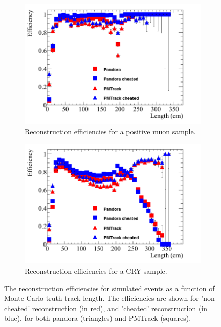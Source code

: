\begin{figure}[h!]
  \centering
  \begin{subfigure}{0.48\textwidth}
    \centering
    \includegraphics[width=\textwidth]{Effic_AntiMuon_500V_All_Length}
    \caption{Reconstruction efficiencies for a positive muon sample.}
    \label{fig:SimEffic_Length_AMu}
  \end{subfigure}%
  \hspace{0.03\textwidth}%
  \begin{subfigure}{0.48\textwidth}
    \centering
    \includegraphics[width=\textwidth]{Effic_Cosmics_500V_All_Length}
    \caption{Reconstruction efficiencies for a CRY sample.}
    \label{fig:SimEffic_Length_CRY}
  \end{subfigure}
  \caption[The reconstruction efficiencies for simulated events as a function of Monte Carlo truth track length.]
          {The reconstruction efficiencies for simulated events as a function of Monte Carlo truth track length. The efficiencies are shown for 'non-cheated' reconstruction (in red), and 'cheated' reconstruction (in blue), for both pandora (triangles) and PMTrack (squares).}
          \label{fig:SimEffic_Length}
\end{figure}


